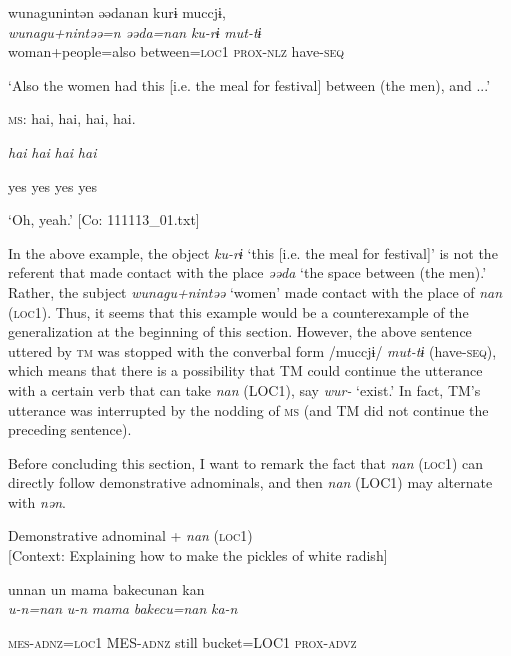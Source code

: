 \begin{table}
{\TM}
\glll wunagunintən  əədanan  kurɨ  muccjɨ,\\
\textit{wunagu+nintəə=n}  \textit{əəda=nan}  \textit{ku-rɨ}  \textit{mut-tɨ}\\

    woman+people=also  between=\textsc{loc}1  \textsc{prox}-\textsc{nlz}  have-\textsc{seq}

\glt    ‘Also the women had this [i.e. the meal for festival] between (the men), and ...’

  \textsc{ms}:  {\textbar}hai,  hai,  hai,  hai.{\textbar}

    \textit{hai}  \textit{hai}  \textit{hai}  \textit{hai}

    yes  yes  yes  yes

\glt    ‘Oh, yeah.’ [Co: 111113\_01.txt]
\z

In the above example, the object \textit{ku-rɨ} ‘this [i.e. the meal for festival]’ is not the referent that made contact with the place \textit{əəda} ‘the space between (the men).’ Rather, the subject \textit{wunagu+nintəə} ‘women’ made contact with the place of \textit{nan} (\textsc{loc}1). Thus, it seems that this example would be a counterexample of the generalization at the beginning of this section. However, the above sentence uttered by \textsc{tm} was stopped with the converbal form /muccjɨ/ \textit{mut-tɨ} (have-\textsc{seq}), which means that there is a possibility that TM could continue the utterance with a certain verb that can take \textit{nan} (LOC1), say \textit{wur-} ‘exist.’ In fact, TM’s utterance was interrupted by the nodding of \textsc{ms} (and TM did not continue the preceding sentence).

Before concluding this section, I want to remark the fact that \textit{nan} (\textsc{loc}1) can directly follow demonstrative adnominals, and then \textit{nan} (LOC1) may alternate with \textit{nən}.

\ea\label{ex:6-64}
\ea Demonstrative adnominal + \textit{nan} (\textsc{loc}1)\\{}
[Context: Explaining how to make the pickles of white radish]

{\TM}
\glll unnan  un  mama  {\textbar}bakecu{\textbar}nan  kan\\

      \textit{u-n=nan}  \textit{u-n}  \textit{mama}  \textit{bakecu=nan}  \textit{ka-n}

      \textsc{mes}-\textsc{adnz}=\textsc{loc}1  MES-\textsc{adnz}  still  bucket=LOC1  \textsc{prox}-\textsc{advz}


\end{table}
